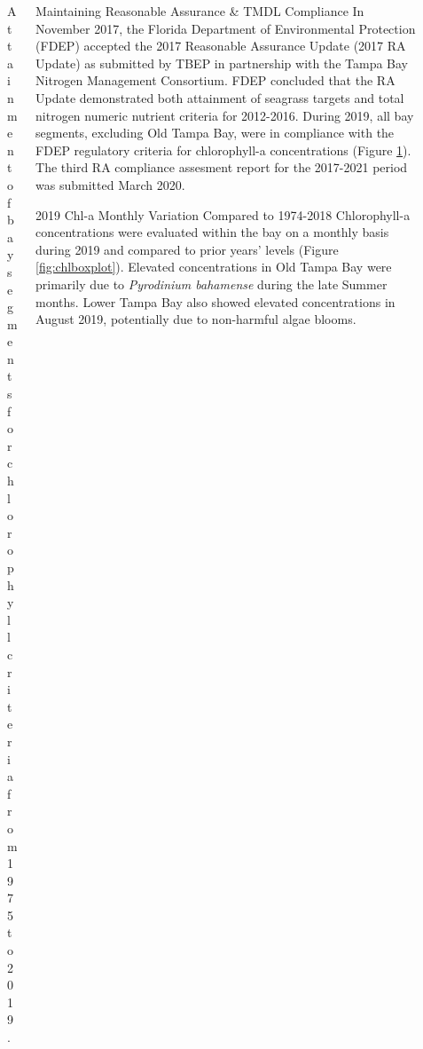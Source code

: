 \documentclass[final,t]{beamer}\usepackage[]{graphicx}\usepackage[]{color}
\begin{document}
\begin{frame}
\begin{columns}[t]
\begin{column}{.2\linewidth}
\begin{figure}
\caption{\footnotesize Attainment of bay segments for chlorophyll criteria from 1975 to 2019.}
\label{fig:chlmat}
\end{figure}

\end{column}

\begin{column}{.79\linewidth}

\begin{block}{Maintaining Reasonable Assurance \& TMDL Compliance}
\footnotesize
In November 2017, the Florida Department of Environmental Protection (FDEP) accepted the 2017 Reasonable Assurance Update (2017 RA Update) as submitted by TBEP in partnership with the Tampa Bay Nitrogen Management Consortium. FDEP concluded that the RA Update demonstrated both attainment of seagrass targets and total nitrogen numeric nutrient criteria for 2012-2016. During 2019, all bay segments, excluding Old Tampa Bay, were in compliance with the FDEP regulatory criteria for chlorophyll-a concentrations (Figure \ref{fig:chlmat}). The third RA compliance assesment report for the 2017-2021 period was submitted March 2020. 
\end{block}

\begin{block}{2019 Chl-a Monthly Variation Compared to 1974-2018}
\footnotesize
Chlorophyll-a concentrations were evaluated within the bay on a monthly basis during 2019 and compared to prior years' levels (Figure \ref{fig:chlboxplot}). Elevated concentrations in Old Tampa Bay were primarily due to \textit{Pyrodinium bahamense} during the late Summer months. Lower Tampa Bay also showed elevated concentrations in August 2019, potentially due to non-harmful algae blooms.
\end{block}



\vspace{-0.1in}


\end{column}
\end{columns}
\end{frame}
\end{document}
